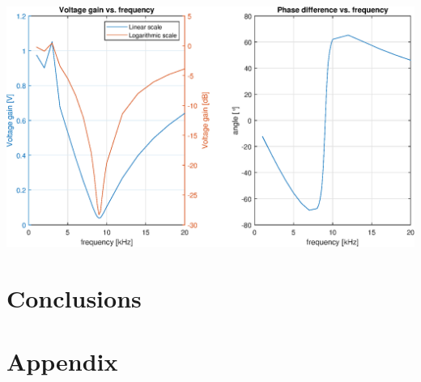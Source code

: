 \documentclass[notitlepage, a4paper, 11pt]{article}
\begin{document}
	\includegraphics[width=\textwidth]{../Matlab/img/132.eps}
	\section{Conclusions}
	
	
	\newpage
	\appendix
	\section{Appendix}\label{sec:appendix}
\end{document}
